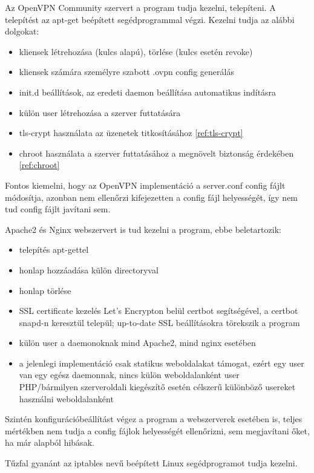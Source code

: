 Az OpenVPN Community szervert a program tudja kezelni, telepíteni. A telepítést az apt-get beépített segédprogrammal végzi. Kezelni tudja az alábbi dolgokat:
\begin{itemize}
	\item kliensek létrehozása (kulcs alapú), törlése (kulcs esetén revoke)
	\item kliensek számára személyre szabott .ovpn config generálás
	\item init.d beállítások, az eredeti daemon beállítása automatikus indításra
	\item külön user létrehozása a szerver futtatására
	\item tls-crypt használata az üzenetek titkosításához \ref{ref:tls-crypt}
	\item chroot használata a szerver futtatásához a megnövelt biztonság érdekében \ref{ref:chroot}
\end{itemize}
Fontos kiemelni, hogy az OpenVPN implementáció a server.conf config fájlt módosítja, azonban nem ellenőrzi kifejezetten a config fájl helyességét, így nem tud config fájlt javítani sem.

Apache2 és Nginx webszervert is tud kezelni a program, ebbe beletartozik:
\begin{itemize}
	\item telepítés apt-gettel
	\item honlap hozzáadása külön directoryval
	\item honlap törlése
	\item SSL certificate kezelés Let's Encrypton belül certbot segítségével, a certbot snapd-n keresztül települ; up-to-date SSL beállításokra törekszik a program
	\item külön user a daemonoknak mind Apache2, mind nginx esetében
	\item a jelenlegi implementáció csak statikus weboldalakat támogat, ezért egy user van egy egész daemonnak, nincs külön weboldalanként user\\PHP/bármilyen szerveroldali kiegészítő esetén célszerű különböző usereket használni weboldalanként
\end{itemize}

Szintén konfigurációbeállítást végez a program a webszerverek esetében is, teljes mértékben nem tudja a config fájlok helyességét ellenőrizni, sem megjavítani őket, ha már alapból hibásak.

Tűzfal gyanánt az iptables nevű beépített Linux segédprogramot tudja kezelni.

\pagebreak

